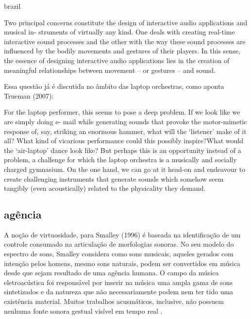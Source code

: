 \begin{otherlanguage*}{brazil}
\begin{citacao}
Two principal concerns constitute the design of interactive audio applications and musical in- struments of virtually any kind. One deals with creating real-time interactive sound processes and the other with the way these sound processes are influenced by the bodily movements and gestures of their players. In this sense, the essence of designing interactive audio applications lies in the creation of meaningful relationships between movement – or gestures – and sound. \cite{Schnell2013}
\end{citacao}
Essa questão já é discutida no âmbito das laptop orchestras, como aponta Trueman (2007):
\begin{citacao}
For the laptop performer, this seems to pose a
deep problem. If we look like we are simply doing e- mail while generating sounds that provoke the motor-mimetic response of, say, striking an enormous hammer, what will the ‘listener’ make of it all? What kind of vicarious performance could this possibly inspire?What would the ‘air-laptop’ dance look like? 
But perhaps this is an opportunity instead of a problem, a challenge for which the laptop orchestra is a musically and socially charged gymnasium. On the one hand, we can go at it head-on and endeavour to create challenging instruments that generate sounds which somehow seem tangibly (even acoustically) related to the physicality they demand.





\cite[6]{Trueman2007}
\end{citacao}

\subsection{agência}


A noção de virtuosidade, para Smalley (1996) é baseada na identificação de um controle consumado na articulação de morfologias sonoras. No seu modelo do espectro de sons, Smalley considera como sons musicais, aqueles gerados com intenção pelos homens, mesmo sons naturais, podem ser convertidos em música desde que sejam resultado de uma agência humana. O campo da música eletroacústica foi responsável por inserir na música uma ampla gama de sons sintetizados e da natureza que não necessariamente podem nem ter tido uma existência material. Muitos trabalhos acusmáticos, inclusive, não possuem nenhuma fonte sonora gestual visível em tempo real \cite[95, 101]{Smalley1996}.




\end{otherlanguage*}
